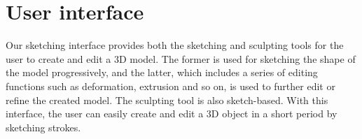 %
%


\section{User interface}
\label{ch3:sec:ui}

Our sketching interface provides both the sketching and sculpting
tools for the user to create and edit a 3D model. The former is used
for sketching the shape of the model progressively, and the latter,
which includes a series of editing functions such as deformation,
extrusion and so on, is used to further edit or refine the created
model. The sculpting tool is also sketch-based. With this interface, 
the user can easily create and edit a 3D object in a short period by
sketching strokes.

